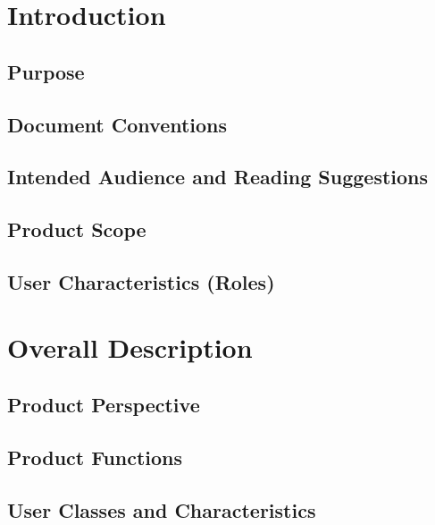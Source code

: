     \chapter{Introduction}\label{ch:Introduction}
        \section{Purpose}
            
        \section{Document Conventions}
            
        \section{Intended Audience and Reading Suggestions}
            
        \section{Product Scope}
            
        \section{User Characteristics (Roles)}
            
    

    \chapter{Overall Description}\label{ch:Overall Description}
        \section{Product Perspective}   
            
        \section{Product Functions}
            
        \section{User Classes and Characteristics}
            
